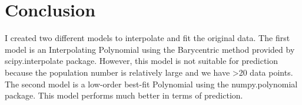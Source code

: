 \documentclass[11pt]{article}
\begin{document}
\section{Conclusion}
I created two different models to interpolate and fit the original data. The first model is an Interpolating Polynomial using the Barycentric method provided by scipy.interpolate package. However, this model is not suitable for prediction because the population number is relatively large and we have >20 data points. The second model is a low-order best-fit Polynomial using the numpy.polynomial package. This model performs much better in terms of prediction.
\end{document}
